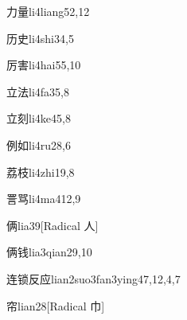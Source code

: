\begin{verbete}{力量}{li4liang5}{2,12}
\end{verbete}

\begin{verbete}{历史}{li4shi3}{4,5}
\end{verbete}

\begin{verbete}{厉害}{li4hai5}{5,10}
\end{verbete}

\begin{verbete}{立法}{li4fa3}{5,8}
\end{verbete}

\begin{verbete}{立刻}{li4ke4}{5,8}
\end{verbete}

\begin{verbete}{例如}{li4ru2}{8,6}
\end{verbete}

\begin{verbete}{荔枝}{li4zhi1}{9,8}
\end{verbete}

\begin{verbete}{詈骂}{li4ma4}{12,9}
\end{verbete}

\begin{verbete}{俩}{lia3}{9}[Radical 人]
\end{verbete}

\begin{verbete}{俩钱}{lia3qian2}{9,10}
\end{verbete}

\begin{verbete}{连锁反应}{lian2suo3fan3ying4}{7,12,4,7}
\end{verbete}

\begin{verbete}{帘}{lian2}{8}[Radical 巾]
\end{verbete}


